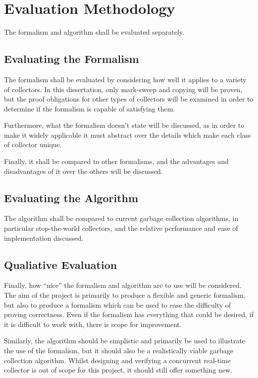 
\section{Evaluation Methodology}

The formalism and algorithm shall be evaluated separately.

\subsection{Evaluating the Formalism}

The formalism shall be evaluated by considering how well it applies to
a variety of collectors. In this dissertation, only mark-sweep and
copying will be proven, but the proof obligations for other types of
collectors will be examined in order to determine if the formalism is
capable of satisfying them.

Furthermore, what the formalism doesn't state will be discussed, as in
order to make it widely applicable it must abstract over the details
which make each class of collector unique.

Finally, it shall be compared to other formalisms, and the advantages
and disadvantages of it over the others will be discussed.

\subsection{Evaluating the Algorithm}

The algorithm shall be compared to current garbage collection
algorithms, in particular stop-the-world collectors, and the relative
performance and ease of implementation discussed.

\subsection{Qualiative Evaluation}

Finally, how ``nice'' the formalism and algorithm are to use will be
considered. The aim of the project is primarily to produce a flexible
and generic formalism, but also to produce a formalism which can be
used to ease the difficulty of proving correctness. Even if the
formalism has everything that could be desired, if it is difficult to
work with, there is scope for improvement.

Similarly, the algorithm should be simplistic and primarily be used to
illustrate the use of the formalism, but it should also be a
realistically viable garbage collection algorithm. Whilst designing
and verifying a concurrent real-time collector is out of scope for
this project, it should still offer something new.
